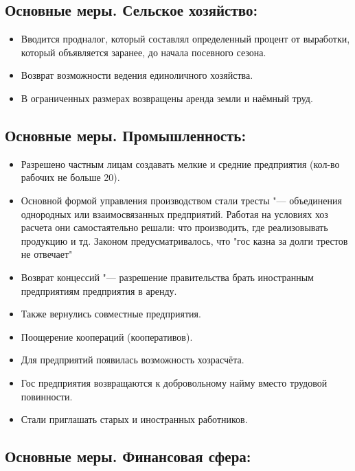 \subsection{Основные меры. Сельское хозяйство:}

\begin{itemize}
    \item Вводится продналог, который составлял определенный процент от выработки, который объявляется заранее, до начала посевного сезона.
    \item Возврат возможности ведения единоличного хозяйства.
    \item В ограниченных размерах возвращены аренда земли и наёмный труд.
\end{itemize}

\subsection{Основные меры. Промышленность:}

\begin{itemize}
    \item Разрешено частным лицам создавать мелкие и средние предприятия (кол-во рабочих не больше 20).
    \item Основной формой управления производством стали тресты "--- объединения однородных или взаимосвязанных предприятий. Работая на условиях хоз расчета они самостаятельно решали: что производить, где реализовывать продукцию и тд. Законом предусматривалось, что "гос казна за долги трестов не отвечает"
    \item Возврат концессий "--- разрешение правительства брать иностранным предприятиям предприятия в аренду. 
    \item Также вернулись совместные предприятия.
    \item Поощерение коопераций (кооперативов).
    \item Для предприятий появилась возможность хозрасчёта.
    \item Гос предприятия возвращаются к добровольному найму вместо трудовой повинности.
    \item Стали приглашать старых и иностранных работников.
\end{itemize}

\subsection{Основные меры. Финансовая сфера:}


